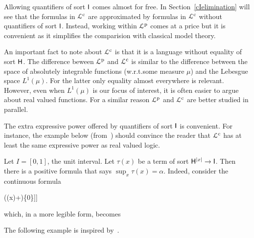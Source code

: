 \documentclass{amsproc}
\def\dotminus{\stackon[.2ex]{$-$}{$.$}}
\begin{document}
Allowing quantifiers of sort ${\sf I}$ comes almost for free.
In Section~\ref{cIelimination} will see that the formulas in ${\EuScript L}^{\rm c}$ are approximated by formulas in ${\EuScript L}^{\rm c}$ without quantifiers of sort ${\sf I}$.
Instead, working within ${\EuScript L}^{\rm p}$ comes at a price but it is convenient as it simplifies the comparision with classical model theory.

An important fact to note about ${\EuScript L}^{\rm c}$ is that it is a language without equality of sort ${\sf H}$.
The difference beween ${\EuScript L}^{\rm p}$ and ${\EuScript L}^{\rm c}$ is similar to the difference between the space of absolutely integrable functions (w.r.t.\@ some measure $\mu$) and the Lebesgue space $L^1(\mu)$.
For the latter only equality almost everywhere is relevant.
However, even when $L^1(\mu)$ is our focus of interest, it is often easier to argue about real valued functions.
For a similar reason ${\EuScript L}^{\rm p}$ and ${\EuScript L}^{\rm c}$ are better studied in parallel.

The extra expressive power offered by quantifiers of sort ${\sf I}$ is convenient.
For instance, the example below (from~\cite{clcl}) should convince the reader that ${\EuScript L}^{\rm c}$ has at least the same expressive power as real valued logic.%

\begin{example}\label{ex_Rvlogic}
  Let $I=[0,1]$, the unit interval.
  Let $\tau(x)$ be a term of sort ${\sf H}^{|x|}\to {\sf I}$.
  Then there is a positive formula that says $\sup_x \tau(x)=\alpha$.
  Indeed, consider the continuous formula

  \ceq{\hfill\forall x\ \big[\tau(x)\dotminus\alpha\in\{0\}\big]}
  {\wedge}{\forall \varepsilon \Big[\varepsilon\in\{0\}\ \vee\ \exists x\ \big[\alpha\dotminus (\tau(x)+\varepsilon)\in\{0\}\big]\Big]}

  which, in a more legible form, becomes

\end{example}

The following example is inspired by~\cite{HPP}.
\end{document}
